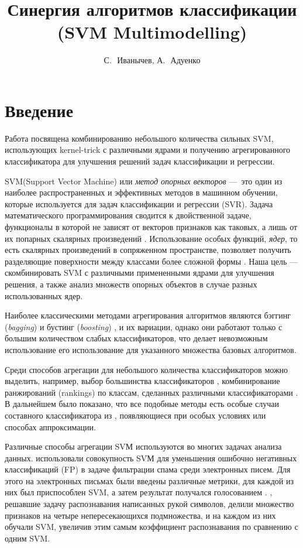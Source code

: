 \documentclass[12pt,twoside]{article}
\title
    {Синергия алгоритмов классификации (SVM Multimodelling)}
\author
    {С.\,~Иванычев, А.\,~Адуенко}
\begin{document}
\maketitle

\section{Введение}
Работа посвящена комбинированию небольшого количества сильных SVM, использующих kernel-trick с различными ядрами и получению агрегированного классификатора для улучшения решений задач классификации и регрессии.

    SVM(Support Vector Machine) или \emph{метод опорных векторов}\cite{Cortes1995, Boser1992} ---~это один из наиболее распространенных и эффективных методов в машинном обучении, которые используется для задач классификации и регрессии (SVR). Задача математического программирования сводится к двойственной задаче, функционалы в которой не зависят от векторов признаков как таковых, а лишь от их попарных скалярных произведений \cite{Voron} . Использование особых функций, \emph{ядер}, то есть скалярных произведений в сопряженном пространстве, позволяет получить разделяющие поверхности между классами более сложной формы \cite{Smola2004}. Наша цель --- скомбинировать SVM
    с различными примененными ядрами для улучшения решения, а также анализ множеств опорных объектов в случае разных использованных ядер.

    Наиболее классическими методами агрегирования алгоритмов являются
    бэггинг (\emph{bagging})\cite{Breiman1996} и бустинг (\emph{boosting}) \cite{Freund1995}, и их
    вариации, однако они работают только с  большим количеством слабых классификаторов, что делает невозможным использование его использование для указанного множества базовых алгоритмов.

    Среди способов агрегации для небольшого количества классификаторов можно
    выделить, например, выбор большинства классификаторов \cite{Franke1992},
    комбинирование ранжирований (rankings) по классам, сделанных различными
    классификаторами \cite{Ho1994}. В дальнейшем было показано, что все подобные
    методы есть особые случаи составного классификатора из \cite{Kittler1996},
    появляющиеся при особых условиях или способах аппроксимации.

    Различные способы агрегации SVМ используются во многих задачах анализа данных.
    \cite{Martin-merino2007} использовали совокупность SVМ для уменьшения ошибочно негативных классификаций (FP) в задаче фильтрации спама среди электронных писем.
    Для этого на электронных письмах были введены различные метрики, для каждой из них был приспособлен SVM, а затем результат получался голосованием \cite{Kittler1996}.
    \cite{Gorgevik2005}, решавшие задачу распознавания написанных рукой символов, делили множество признаков на четыре непересекающихся подмножества, и на каждом из них обучали SVM, увеличив этим самым коэффициент распознавания по сравнению с одним SVM.
\end{document}
